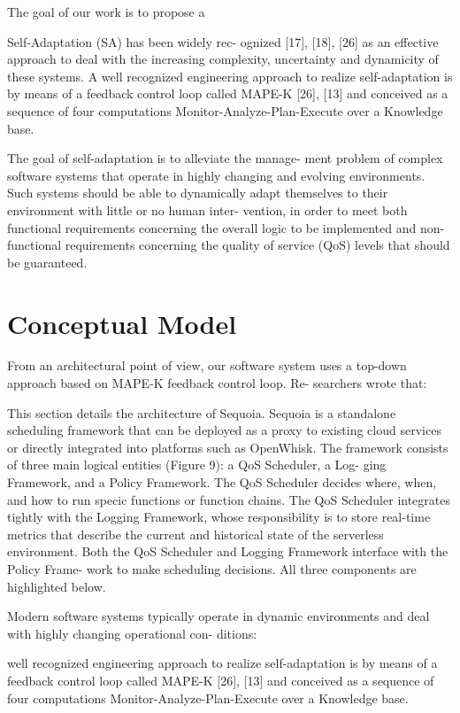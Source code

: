 \documentclass[12pt,a4paper]{report}
\begin{document}
The goal of our work is to propose a 



Self-Adaptation (SA) has been widely rec-
ognized [17], [18], [26] as an effective approach to deal
with the increasing complexity, uncertainty and dynamicity
of these systems. A well recognized engineering approach
to realize self-adaptation is by means of a feedback control
loop called MAPE-K [26], [13] and conceived as a sequence
of four computations Monitor-Analyze-Plan-Execute over a
Knowledge base.




The goal of self-adaptation is to alleviate the manage-
ment problem of complex software systems that operate
in highly changing and evolving environments. Such
systems should be able to dynamically adapt themselves
to their environment with little or no human inter-
vention, in order to meet both functional requirements
concerning the overall logic to be implemented and non-
functional requirements concerning the quality of service
(QoS) levels that should be guaranteed.

\chapter{Conceptual Model}


From an architectural point of view, our software system uses a top-down approach based on MAPE-K feedback control loop. Re-
searchers wrote that:


This section details the architecture of Sequoia. Sequoia is a
standalone scheduling framework that can be deployed as a
proxy to existing cloud services or directly integrated into
platforms such as OpenWhisk. The framework consists of
three main logical entities (Figure 9): a QoS Scheduler, a Log-
ging Framework, and a Policy Framework. The QoS Scheduler
decides where, when, and how to run specic functions or
function chains. The QoS Scheduler integrates tightly with
the Logging Framework, whose responsibility is to store
real-time metrics that describe the current and historical
state of the serverless environment. Both the QoS Scheduler
and Logging Framework interface with the Policy Frame-
work to make scheduling decisions. All three components
are highlighted below.


Modern software systems typically operate in dynamic
environments and deal with highly changing operational con-
ditions: 

 well recognized engineering approach
to realize self-adaptation is by means of a feedback control
loop called MAPE-K [26], [13] and conceived as a sequence
of four computations Monitor-Analyze-Plan-Execute over a
Knowledge base.
\end{document}
